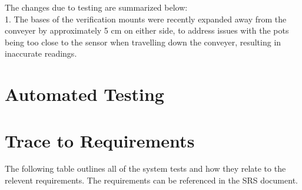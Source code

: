 \documentclass[12pt, titlepage]{article}
\begin{document}
The changes due to testing are summarized below:
\\
1. The bases of the verification mounts were recently expanded away from the
conveyer by approximately 5 cm on either side, to address issues with the pots being too close to the sensor when travelling down the conveyer, resulting in inaccurate readings.

\section{Automated Testing}
		
\section{Trace to Requirements}

The following table outlines all of the system tests and how they relate to the
relevent requirements. The requirements can be referenced in the SRS document.\\
\end{document}
